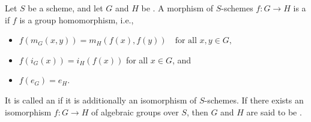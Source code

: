 \begin{definition} \label{definition:homomorphism_of_algebraic_groups_over_a_scheme}
Let $S$ be a scheme, and let $G$ and $H$ be . A morphism of $S$-schemes $f: G \to H$ is a  if $f$ is a group homomorphism, i.e.,
\begin{itemize}
    \item $f(m_G(x, y)) = m_H(f(x), f(y)) \quad \text{for all } x, y \in G,$
    \item $f(i_G(x)) = i_H(f(x))$ for all $x \in G$, and 
    \item $f(e_G) = e_H$.
\end{itemize}
It is called an  if it is additionally an isomorphism of $S$-schemes. If there exists an isomorphism $f: G \to H$ of algebraic groups over $S$, then $G$ and $H$ are said to be .
\end{definition}
